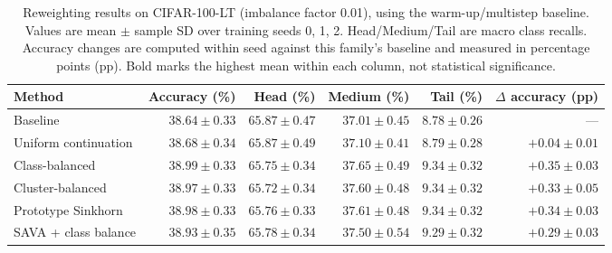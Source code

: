 \begin{table}[t]
\centering
\small
\setlength{\tabcolsep}{4pt}
\caption{Reweighting results on CIFAR-100-LT (imbalance factor 0.01), using the warm-up/multistep baseline. Values are mean $\pm$ sample SD over training seeds 0, 1, 2. Head/Medium/Tail are macro class recalls. Accuracy changes are computed within seed against this family's baseline and measured in percentage points (pp). Bold marks the highest mean within each column, not statistical significance.}
\label{tab:ot-reweighting}
\begin{tabular}{lrrrrr}
\toprule
Method & Accuracy (\%) & Head (\%) & Medium (\%) & Tail (\%) & $\Delta$ accuracy (pp) \\
\midrule
Baseline & $38.64 \pm 0.33$ & $\boldsymbol{65.87 \pm 0.47}$ & $37.01 \pm 0.45$ & $8.78 \pm 0.26$ & --- \\
Uniform continuation & $38.68 \pm 0.34$ & $\boldsymbol{65.87 \pm 0.49}$ & $37.10 \pm 0.41$ & $8.79 \pm 0.28$ & $+0.04 \pm 0.01$ \\
Class-balanced & $\boldsymbol{38.99 \pm 0.33}$ & $65.75 \pm 0.34$ & $\boldsymbol{37.65 \pm 0.49}$ & $\boldsymbol{9.34 \pm 0.32}$ & $\boldsymbol{+0.35 \pm 0.03}$ \\
Cluster-balanced & $38.97 \pm 0.33$ & $65.72 \pm 0.34$ & $37.60 \pm 0.48$ & $\boldsymbol{9.34 \pm 0.32}$ & $+0.33 \pm 0.05$ \\
Prototype Sinkhorn & $38.98 \pm 0.33$ & $65.76 \pm 0.33$ & $37.61 \pm 0.48$ & $\boldsymbol{9.34 \pm 0.32}$ & $+0.34 \pm 0.03$ \\
SAVA + class balance & $38.93 \pm 0.35$ & $65.78 \pm 0.34$ & $37.50 \pm 0.54$ & $9.29 \pm 0.32$ & $+0.29 \pm 0.03$ \\
\bottomrule
\end{tabular}
\end{table}
